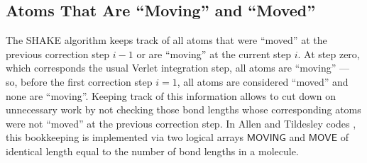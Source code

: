\subsection{Atoms That Are ``Moving'' and ``Moved''}
\label{sec:moving-moved}
\par The SHAKE algorithm keeps track of all atoms that were ``moved'' at the previous correction step $i-1$ or are ``moving'' at the current step $i$. At step zero, which corresponds the usual Verlet integration step, all atoms are ``moving'' --- so, before the first correction step $i = 1$, all atoms are considered ``moved'' and none are ``moving''. Keeping track of this information allows to cut down on unnecessary work by not checking those bond lengths whose corresponding atoms were not ``moved'' at the previous correction step. In Allen and Tildesley codes \cite{allen-codes}, this bookkeeping is implemented via two logical arrays $\textsf{MOVING}$ and $\textsf{MOVE}$ of identical length equal to the number of bond lengths in a molecule.